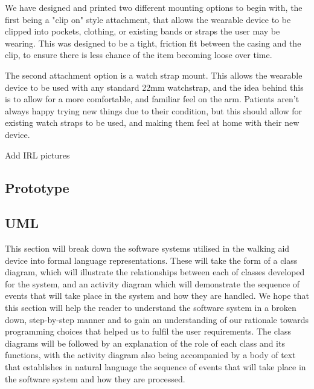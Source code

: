             

            We have designed and printed two different mounting options to begin with, the first being a "clip on" style attachment, that allows the wearable device to be clipped into pockets, clothing, or existing bands or straps the user may be wearing. This was designed to be a tight, friction fit between the casing and the clip, to ensure there is less chance of the item becoming loose over time.

            

            The second attachment option is a watch strap mount. This allows the wearable device to be used with any standard 22mm watchstrap, and the idea behind this is to allow for a more comfortable, and familiar feel on the arm. Patients aren't always happy trying new things due to their condition, but this should allow for existing watch straps to be used, and making them feel at home with their new device.

            \todo Add IRL pictures

            

        \subsection{Prototype}
        \label{subsec:Prototype_wearable}

        \subsection{UML}
        \label{sec:uml_wearable}
        
            This section will break down the software systems utilised in the walking aid device into formal language representations. These will take the form of a class diagram, which will illustrate the relationships between each of classes developed for the system, and an activity diagram which will demonstrate the sequence of events that will take place in the system and how they are handled. We hope that this section will help the reader to understand the software system in a broken down, step-by-step manner and to gain an understanding of our rationale towards programming choices that helped us to fulfil the user requirements. The class diagrams will be followed by an explanation of the role of each class and its functions, with the activity diagram also being accompanied by a body of text that establishes in natural language the sequence of events that will take place in the software system and how they are processed.

